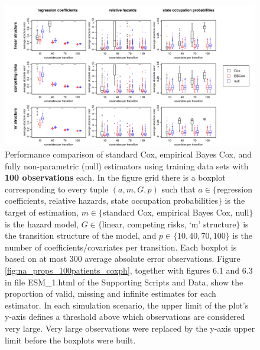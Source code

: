     \begin{figure}[h] 
    \centering         
    \includegraphics[width=14.5cm, angle=0]{figures/estimator_performance_boxplots_100patients.pdf} %
    \vspace*{0.25cm}     %
    \caption{Performance comparison of standard Cox,  empirical Bayes Cox,  and fully non-parametric (null) estimators using training data sets with \textbf{100 observations} each.  In the figure grid there is a boxplot corresponding to every tuple $(a,m, G, p)$ such that $a\in \lbrace$regression coefficients, relative hazards, state occupation probabilities$\rbrace$ is the target of estimation,  $m\in \lbrace$standard Cox, empirical Bayes Cox, null$\rbrace$ is the hazard model,  $G \in \lbrace$linear, competing risks, `m' structure$\rbrace$ is the transition structure of the model, and $p \in \lbrace 10,40,70,100 \rbrace$ is the number of coefficients/covariates per transition.  
    Each boxplot is based on at most 300 average absolute error observations.
    Figure \ref{fig:na_props_100patients_coxph}, together with figures 6.1 and 6.3 in file ESM\_1.html of the Supporting Scripts and Data, show the proportion of valid, missing and infinite estimates for each estimator. In each simulation scenario, the upper limit of the plot's y-axis  defines a threshold above which observations are considered very large. Very large observations were replaced by the y-axis upper limit before the boxplots were built. 
    }      
    \label{fig:estimator_performance_boxplots_100patients} %
    \end{figure} 
    
